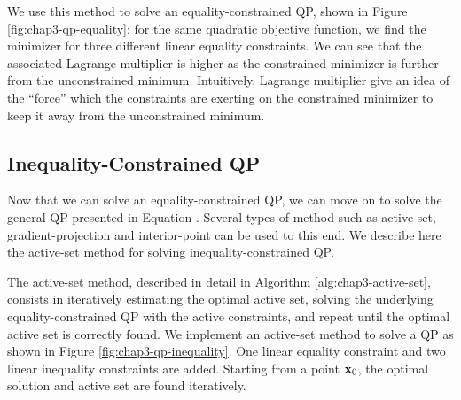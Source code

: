 We use this method to solve an equality-constrained QP, shown in
Figure \ref{fig:chap3-qp-equality}: for the same quadratic objective
function, we find the minimizer for three different linear equality
constraints. We can see that the associated Lagrange multiplier is
higher as the constrained minimizer is further from the unconstrained
minimum. Intuitively, Lagrange multiplier give an idea of the
``force'' which the constraints are exerting on the constrained
minimizer to keep it away from the unconstrained minimum.

\subsection{Inequality-Constrained QP}

Now that we can solve an equality-constrained QP, we can move on to
solve the general QP presented in Equation
. Several types of method such as active-set,
gradient-projection and interior-point can be used to this end. We
describe here the active-set method for solving inequality-constrained
QP.

The active-set method, described in detail in Algorithm
\ref{alg:chap3-active-set}, consists in iteratively estimating the
optimal active set, solving the underlying equality-constrained QP
with the active constraints, and repeat until the optimal active set
is correctly found. We implement an active-set method to solve a QP as
shown in Figure \ref{fig:chap3-qp-inequality}. One linear equality
constraint and two linear inequality constraints are added. Starting
from a point $\mathbf{x}_0$, the optimal solution and active set are
found iteratively.


